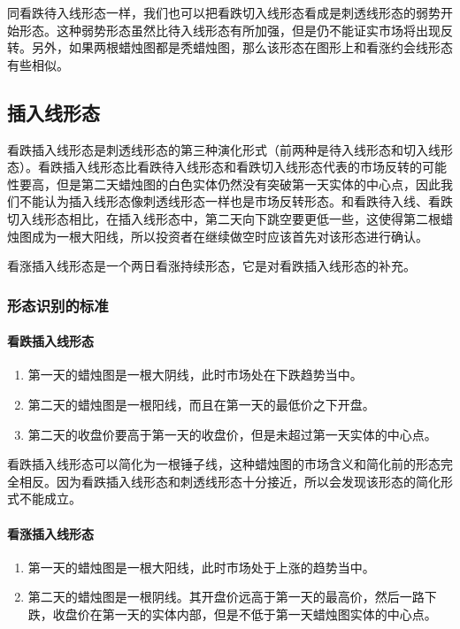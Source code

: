同看跌待入线形态一样，我们也可以把看跌切入线形态看成是刺透线形态的弱势开始形态。这种弱势形态虽然比待入线形态有所加强，但是仍不能证实市场将出现反转。另外，如果两根蜡烛图都是秃蜡烛图，那么该形态在图形上和看涨约会线形态有些相似。
\subsection{插入线形态}
看跌插入线形态是刺透线形态的第三种演化形式（前两种是待入线形态和切入线形态）。看跌插入线形态比看跌待入线形态和看跌切入线形态代表的市场反转的可能性要高，但是第二天蜡烛图的白色实体仍然没有突破第一天实体的中心点，因此我们不能认为插入线形态像刺透线形态一样也是市场反转形态。和看跌待入线、看跌切入线形态相比，在插入线形态中，第二天向下跳空要更低一些，这使得第二根蜡烛图成为一根大阳线，所以投资者在继续做空时应该首先对该形态进行确认。

看涨插入线形态是一个两日看涨持续形态，它是对看跌插入线形态的补充。
\subsubsection*{形态识别的标准}
\paragraph{看跌插入线形态}
\begin{enumerate}
    \item 第一天的蜡烛图是一根大阴线，此时市场处在下跌趋势当中。
    \item 第二天的蜡烛图是一根阳线，而且在第一天的最低价之下开盘。
    \item 第二天的收盘价要高于第一天的收盘价，但是未超过第一天实体的中心点。
\end{enumerate}

看跌插入线形态可以简化为一根锤子线，这种蜡烛图的市场含义和简化前的形态完全相反。因为看跌插入线形态和刺透线形态十分接近，所以会发现该形态的简化形式不能成立。

\paragraph{看涨插入线形态}
\begin{enumerate}
    \item 第一天的蜡烛图是一根大阳线，此时市场处于上涨的趋势当中。
    \item 第二天的蜡烛图是一根阴线。其开盘价远高于第一天的最高价，然后一路下跌，收盘价在第一天的实体内部，但是不低于第一天蜡烛图实体的中心点。
\end{enumerate}

